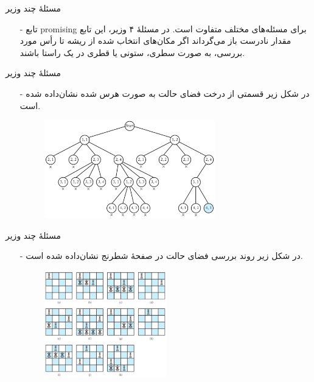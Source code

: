 \begin{frame}{مسئلهٔ چند وزیر}
\begin{itemize}\itemr
\item[-]
تابع
promising
برای مسئله‌های مختلف متفاوت است. در مسئلهٔ ۴ وزیر، این تابع مقدار نادرست باز می‌گرداند اگر مکان‌های انتخاب شده از ریشه تا رأس مورد بررسی، به صورت سطری، ستونی یا قطری در یک راستا باشند.
\end{itemize}
\end{frame}


\begin{frame}{مسئلهٔ چند وزیر}
\begin{itemize}\itemr
\item[-]
در شکل زیر قسمتی از درخت فضای حالت به صورت هرس شده نشان‌داده شده است.
\begin{figure}
\includegraphics[width=0.7\textwidth]{figs/chap06/n-queens-tree2}
\end{figure}
\end{itemize}
\end{frame}


\begin{frame}{مسئلهٔ چند وزیر}
\begin{itemize}\itemr
\item[-]
در شکل زیر روند بررسی فضای حالت در صفحهٔ شطرنج نشان‌داده شده است.
\begin{figure}
\includegraphics[width=0.5\textwidth]{figs/chap06/n-queens-board}
\end{figure}
\end{itemize}
\end{frame}


